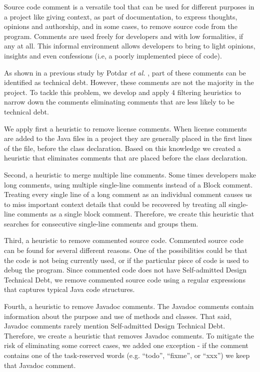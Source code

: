 
Source code comment is a versatile tool that can be used for different purposes in a project like giving context, as part of documentation, to express thoughts, opinions and authorship, and in some cases, to remove source code from the program. Comments are used freely for developers and with low formalities, if any at all. This informal environment allows developers to bring to light opinions, insights and even confessions (i.e, a poorly implemented piece of code). 

As shown in a previous study by Potdar \textit{et al.} \cite{Potdar2014ICSME}, part of these comments can be identified as technical debt. However, these comments are not the majority in the project. To tackle this problem, we develop and apply 4 filtering heuristics to narrow down the comments eliminating comments that are less likely to be technical debt.

We apply first a heuristic to remove license comments. When license comments are added to the Java files in a project they are generally placed in the first lines of the file, before the class declaration. Based on this knowledge we created a heuristic that eliminates comments that are placed before the class declaration. 

Second, a heuristic to merge multiple line comments. Some times developers make long comments, using multiple single-line comments instead of a Block comment. Treating every single line of a long comment as an individual comment causes us to miss important context details that could be recovered by treating all single-line comments as a single block comment. Therefore, we create this heuristic that searches for consecutive single-line comments and groups them.

Third, a heuristic to remove commented source code. Commented source code can be found for several different reasons. One of the possibilities could be that the code is not being currently used, or if the particular piece of code is used to debug the program. Since commented code does not have Self-admitted Design Technical Debt, we remove commented source code using a regular expressions that captures typical Java code structures.

Fourth, a heuristic to remove Javadoc comments. The Javadoc comments contain information about the purpose and use of methods and classes. That said, Javadoc comments rarely mention Self-admitted Design Technical Debt. Therefore, we create a heuristic that removes Javadoc comments. To mitigate the risk of eliminating some correct cases, we added one exception - if the comment contains one of the task-reserved words (e.g. “todo”, “fixme”, or “xxx”) we keep that Javadoc comment.

